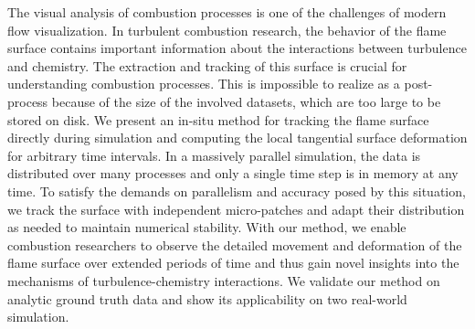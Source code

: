 
%
The visual analysis of combustion processes is one of the challenges of modern
flow visualization.
%
In turbulent combustion research, the behavior of the flame surface contains
important information about the interactions between turbulence and chemistry.
%
The extraction and tracking of this surface is crucial for understanding
combustion processes.
%
This is impossible to realize as a post-process because of the size of the
involved datasets, which are too large to be stored on disk.
%
%
We present an in-situ method for tracking the flame surface directly during
simulation and computing the local tangential surface deformation for arbitrary
time intervals.
%
In a massively parallel simulation, the data is distributed over many processes
and only a single time step is in memory at any time.
%
To satisfy the demands on parallelism and accuracy posed by this situation, we
track the surface with independent micro-patches and adapt their distribution as
needed to maintain numerical stability.
%
%
%
With our method, we enable combustion researchers to observe the detailed
movement and deformation of the flame surface over extended periods of time and
thus gain novel insights into the mechanisms of turbulence-chemistry
interactions.
%
We validate our method on analytic ground truth data and show its applicability
on two real-world simulation.
